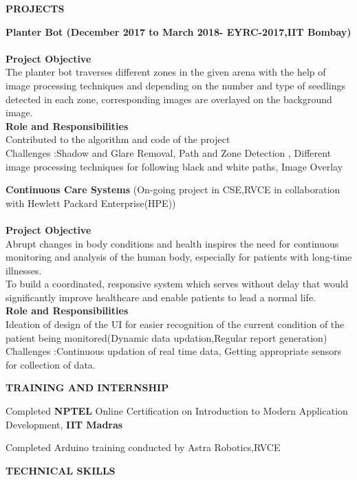 \documentclass[letterpaper,11pt,oneside]{article}
\begin{document}
\vspace{5ex}

\noindent\textbf{{\normalsize PROJECTS}} \begin{enumerate}
	\item 
	\small {\textbf{Planter Bot (December 2017 to March 2018- EYRC-2017,IIT Bombay)}\\\\
		\textbf{Project Objective}\\
		The planter bot traverses different zones in the given arena with the help of image processing techniques
		and depending on the number and type of seedlings detected in each zone, corresponding images are overlayed on the background image.\\
		\textbf{Role and Responsibilities}\\
		Contributed to the algorithm and code of the project\\
		Challenges :Shadow and Glare Removal, Path and Zone Detection , Different image processing techniques for following black and white paths, Image Overlay
		
		\item \textbf{Continuous Care Systems}
		(On-going project in CSE,RVCE in collaboration with Hewlett Packard Enterprise(HPE))\\\\
		\textbf{Project Objective}\\
		Abrupt changes in body conditions and health inspires the need for continuous monitoring and analysis of the human body, especially for patients with long-time illnesses.\\
		To build a coordinated, responsive system which serves without delay that would significantly improve healthcare and enable patients to lead a normal life.\\
		\textbf{Role and Responsibilities}\\
		Ideation of design of the UI for easier recognition of the current condition of the patient being monitored(Dynamic data updation,Regular report generation)\\
		Challenges :Continuous updation of real time data, Getting appropriate sensors for collection of data.
	}
	
\end{enumerate}

\vspace{2ex}

\noindent\textbf{{\normalsize  TRAINING AND INTERNSHIP}} \begin{itemize}
	\small {\item 	Completed \textbf{NPTEL} Online Certification on Introduction to Modern Application Development, \textbf{IIT Madras}
		\item	Completed Arduino training conducted by Astra Robotics,RVCE
	}
\end{itemize}
\vspace{2ex}
\noindent\textbf{{\normalsize  TECHNICAL SKILLS}} 
\end{document}
